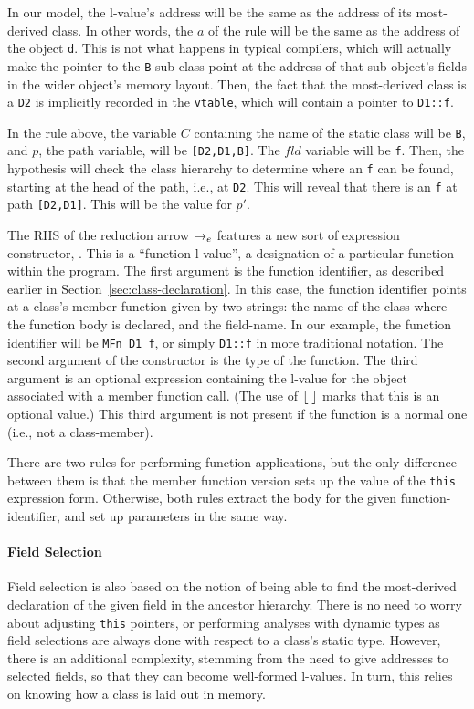 \documentclass[11pt]{article}
\begin{document}
In our model, the l-value's address will be the same as the address of
its most-derived class.  In other words, the $a$ of the rule will be
the same as the address of the object \texttt{d}.  This is not what
happens in typical compilers, which will actually make the pointer to
the \texttt{B} sub-class point at the address of that sub-object's
fields in the wider object's memory layout.  Then, the fact that the
most-derived class is a \texttt{D2} is implicitly recorded in the
\texttt{vtable}, which will contain a pointer to \texttt{D1::f}.

In the rule above, the variable $C$ containing the name of the static
class will be \texttt{B}, and $p$, the path variable, will be
\texttt{[D2,D1,B]}.  The $\mathit{fld}$ variable will be \texttt{f}.
Then, the hypothesis will check the class hierarchy to determine where
an \texttt{f} can be found, starting at the head of the path, i.e., at
\texttt{D2}.  This will reveal that there is an \texttt{f} at path
\texttt{[D2,D1]}.  This will be the value for $p'$.

The RHS of the reduction arrow $\rightarrow_e$ features a new sort of
expression constructor, \cfvalue{}.  This is a ``function l-value'', a
designation of a particular function within the program.  The first
argument is the function identifier, as described earlier in
Section~\ref{sec:class-declaration}.  In this case, the function
identifier points at a class's member function given by two strings:
the name of the class where the function body is declared, and the
field-name.  In our example, the function identifier will be
\texttt{MFn~D1~f}, or simply \texttt{D1::f} in more traditional \cpp{}
notation.  The second argument of the \cfvalue{} constructor is the
type of the function.  The third argument is an optional expression
containing the l-value for the object associated with a member
function call.  (The use of $\lfloor \; \rfloor$ marks that this is an optional
value.)  This third argument is not present if the function is a
normal one (i.e., not a class-member).

There are two rules for performing function applications, but the only
difference between them is that the member function version sets up
the value of the \texttt{this} expression form.  Otherwise, both rules
extract the body for the given function-identifier, and set up
parameters in the same way.

\paragraph{Field Selection}
Field selection is also based on the notion of being able to find the
most-derived declaration of the given field in the ancestor hierarchy.
There is no need to worry about adjusting \texttt{this} pointers, or
performing analyses with dynamic types as field selections are always
done with respect to a class's static type.  However, there is an
additional complexity, stemming from the need to give addresses to
selected fields, so that they can become well-formed l-values.  In
turn, this relies on knowing how a class is laid out in memory.
\end{document}
